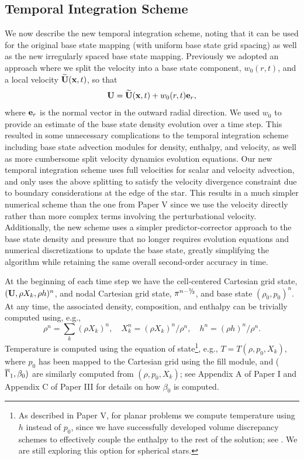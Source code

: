 \subsection{Temporal Integration Scheme}\label{Sec:Temporal Integration Scheme}
We now describe the new temporal integration scheme, noting that it can be used for the original base state mapping 
(with uniform base state grid spacing) as well as the new irregularly spaced base state mapping.
Previously we adopted an approach where we split the velocity into a base state component, $w_0(r,t)$, 
and a local velocity $\widetilde{{\bf{U}}}({\bf{x}},t)$, so that
\begin{equation}
\Ub = \Ubt(\xb,t) + w_0(r,t)\eb_r, \label{eq:velsplit}
\end{equation}
where ${\bf{e}}_r$ is the normal vector in the outward radial direction.
We used $w_0$ to provide an estimate of the base state density evolution over a time step.
This resulted in some unnecessary complications to the temporal integration scheme including
base state advection modules for density, enthalpy, and velocity, as well as more 
cumbersome split velocity dynamics evolution equations.
Our new temporal integration scheme uses full velocities for scalar and velocity advection,
and only uses the above splitting to satisfy the velocity divergence constraint due to boundary considerations
at the edge of the star.
This results in a much simpler numerical scheme than the one from Paper V 
since we use the velocity directly rather than more complex terms involving the perturbational velocity.
Additionally, the new scheme uses a simpler predictor-corrector approach to the base state density and pressure that no 
longer requires evolution equations and numerical discretizations to update the base state, greatly 
simplifying the algorithm while retaining the same overall second-order accuracy in time.

At the beginning of each time step we have the cell-centered Cartesian grid state,
$({\bf{U}},\rho X_k,\rho h)^n$, and nodal Cartesian grid state, $\pi^{n-\myhalf}$, and base state $(\rho_0,p_0)^n$.
At any time, the associated density, composition, and enthalpy can be trivially computed using, e.g.,
\begin{equation}
\rho^n = \sum_k(\rho X_k)^n, \quad
X_k^n = (\rho X_k)^n / \rho^n, \quad
h^n = (\rho h)^n / \rho^n.
\end{equation}
Temperature is computed using the equation of state\footnote{As described in Paper V, for planar problems we compute temperature using $h$ instead of $p_0$, since we have successfully developed volume discrepancy schemes to effectively couple the enthalpy to the rest of the solution; see \cite{XRB_I}.  We are still exploring this option for spherical stars.}, e.g.,
$T = T(\rho,p_0,X_k)$, where $p_0$ has been mapped to the Cartesian grid using the fill module,
and ($\overline{\Gamma}_1,\beta_0)$ are similarly computed from $(\rho,p_0,X_k)$;
see Appendix A of Paper I and Appendix C of Paper III for details on how $\beta_0$ is computed.

